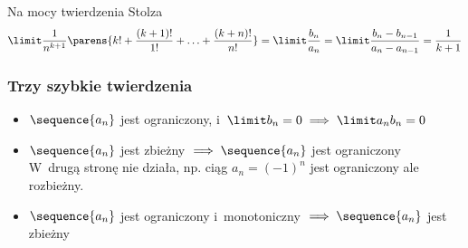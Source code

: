 Na mocy twierdzenia Stolza
\begin{equation*}
    \limit \frac{1}{n^{k+1}}\parens{k! + \frac{(k+1)!}{1!} + \ldots + \frac{(k+n)!}{n!}}
        = \limit \frac{b_n}{a_n}
        = \limit \frac{b_n - b_{n-1}}{a_n - a_{n-1}}
        = \frac{1}{k+1}
\end{equation*}
\subsubsection*{Trzy szybkie twierdzenia}
\begin{itemize}
    \item \(\sequence{a_n}\) jest ograniczony, i~\(\limit b_n = 0 \implies \limit a_nb_n = 0\)
    \item \(\sequence{a_n}\) jest zbieżny \(\implies \sequence{a_n}\) jest ograniczony\\
        W~drugą stronę nie działa, np. ciąg \(a_n = (-1)^n\) jest ograniczony ale rozbieżny.
    \item \(\sequence{a_n}\) jest ograniczony i~monotoniczny \(\implies \sequence{a_n}\) jest zbieżny
\end{itemize}
